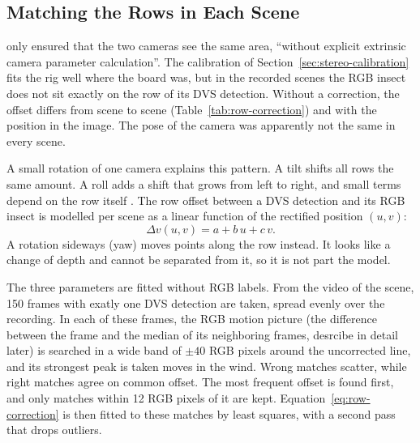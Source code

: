 \subsection{Matching the Rows in Each Scene}
\label{sec:zone-row-correction}

\textcite{gebauer_towards_2024} only ensured that the two cameras see the same area, \enquote{without explicit 
extrinsic camera parameter calculation}. The calibration of Section~\ref{sec:stereo-calibration} fits the rig 
well where the board was, but in the recorded scenes the RGB insect does not sit exactly on the row of its DVS
detection. Without a correction, the offset differs from scene to scene (Table~\ref{tab:row-correction}) and 
with the position in the image. The pose of the camera was apparently not the same in every scene.

A small rotation of one camera explains this pattern. A tilt shifts all rows the same amount. A roll adds a shift
that grows from left to right, and small terms depend on the row itself \parencite{hartley_multiple_2003}. The 
row offset between a DVS detection and its RGB insect is modelled per scene as a linear function of the rectified
position $(u, v)$:
\begin{equation}
    \Delta v(u, v) = a + b\,u + c\,v .
    \label{eq:row-correction}
\end{equation}
A rotation sideways (yaw) moves points along the row instead. It looks like a change of depth and cannot be 
separated from it, so it is not part the model.

The three parameters are fitted without RGB labels. From the video of the scene, 150 frames with exatly one DVS 
detection are taken, spread evenly over the recording. In each of these frames, the RGB motion picture (the 
difference between the frame and the median of its neighboring frames, desrcibe in detail later) is searched in 
a wide band of $\pm 40$ RGB pixels around the uncorrected line, and its strongest peak is taken moves in the 
wind. Wrong matches scatter, while right matches agree on common offset. The most frequent offset is found first,
and only matches within 12 RGB pixels of it are kept. Equation~\ref{eq:row-correction} is then fitted to these 
matches by least squares, with a second pass that drops outliers.

